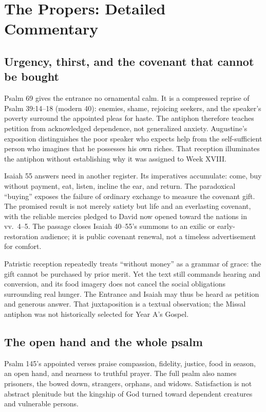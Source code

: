 \section*{The Propers: Detailed Commentary}

\subsection*{Urgency, thirst, and the covenant that cannot be bought\enspace{}}
Psalm 69 gives the entrance no ornamental calm. It is a compressed reprise of
Psalm 39:14--18 (modern 40): enemies, shame, rejoicing seekers, and the
speaker's poverty surround the appointed pleas for haste. The antiphon
therefore teaches petition from acknowledged dependence, not generalized
anxiety. Augustine's exposition distinguishes the poor speaker who expects
help from the self-sufficient person who imagines that he possesses his own
riches. That reception illuminates the antiphon without establishing why it
was assigned to Week XVIII.

Isaiah 55 answers need in another register. Its imperatives accumulate:
come, buy without payment, eat, listen, incline the ear, and return. The
paradoxical ``buying'' exposes the failure of ordinary exchange to measure
the covenant gift. The promised result is not merely satiety but life and an
everlasting covenant, with the reliable mercies pledged to David now opened
toward the nations in vv.~4--5. The passage closes Isaiah 40--55's summons to
an exilic or early-restoration audience; it is public covenant renewal, not a
timeless advertisement for comfort.

Patristic reception repeatedly treats ``without money'' as a grammar of
grace: the gift cannot be purchased by prior merit. Yet the text still
commands hearing and conversion, and its food imagery does not cancel the
social obligations surrounding real hunger. The Entrance and Isaiah may thus
be heard as petition and generous answer. That juxtaposition is a textual
observation; the Missal antiphon was not historically selected for Year A's
Gospel.

\subsection*{The open hand and the whole psalm\enspace{}}
Psalm 145's appointed verses praise compassion, fidelity, justice, food in season, an open hand, and nearness to truthful prayer. The full psalm also names prisoners, the bowed down, strangers, orphans, and widows. Satisfaction is not abstract plenitude but the kingship of God turned toward dependent creatures and vulnerable persons.

